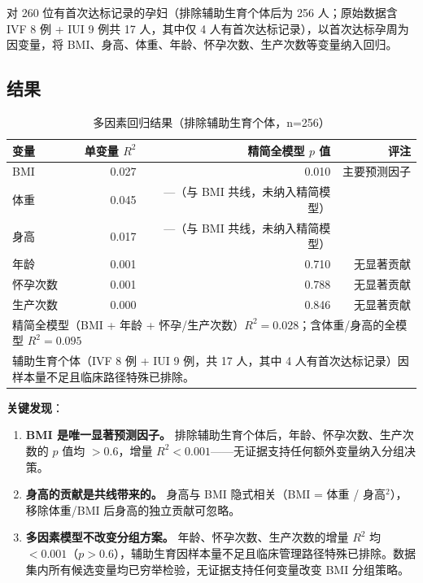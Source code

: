 \documentclass{internal-report}
\begin{document}
对 260 位有首次达标记录的孕妇（排除辅助生育个体后为 256 人；原始数据含 IVF 8 例 + IUI 9 例共 17 人，其中仅 4 人有首次达标记录），以首次达标孕周为因变量，将 BMI、身高、体重、年龄、怀孕次数、生产次数等变量纳入回归。

\subsection{结果}

\begin{table}[H]
\centering
\caption{多因素回归结果（排除辅助生育个体，n=256）}
\begin{tabular}{lrrr}
\toprule
变量 & 单变量 $R^2$ & 精简全模型 $p$ 值 & 评注 \\
\midrule
BMI     & 0.027 & 0.010 & 主要预测因子 \\
体重     & 0.045 & —（与 BMI 共线，未纳入精简模型） & \\
身高     & 0.017 & —（与 BMI 共线，未纳入精简模型） & \\
年龄     & 0.001 & 0.710 & 无显著贡献 \\
怀孕次数   & 0.001 & 0.788 & 无显著贡献 \\
生产次数   & 0.000 & 0.846 & 无显著贡献 \\
\bottomrule
\multicolumn{4}{l}{\footnotesize 精简全模型（BMI + 年龄 + 怀孕/生产次数）$R^2=0.028$；含体重/身高的全模型 $R^2=0.095$} \\
\multicolumn{4}{l}{\footnotesize 辅助生育个体（IVF 8 例 + IUI 9 例，共 17 人，其中 4 人有首次达标记录）因样本量不足且临床路径特殊已排除。} \\
\end{tabular}
\end{table}

\textbf{关键发现}：

\begin{enumerate}
    \item \textbf{BMI 是唯一显著预测因子。} 排除辅助生育个体后，年龄、怀孕次数、生产次数的 $p$ 值均 $>0.6$，增量 $R^2 < 0.001$——无证据支持任何额外变量纳入分组决策。
    \item \textbf{身高的贡献是共线带来的。} 身高与 BMI 隐式相关（BMI = 体重 / 身高$^2$），移除体重/BMI 后身高的独立贡献可忽略。
    \item \textbf{多因素模型不改变分组方案。} 年龄、怀孕次数、生产次数的增量 $R^2$ 均 $<0.001$（$p>0.6$），辅助生育因样本量不足且临床管理路径特殊已排除。数据集内所有候选变量均已穷举检验，无证据支持任何变量改变 BMI 分组策略。
\end{enumerate}
\end{document}
